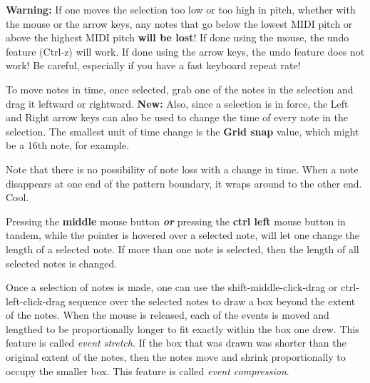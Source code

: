    \textbf{Warning:}
   If one moves the selection too low or too high in pitch, whether with the
   mouse or the arrow keys, any notes that go below the lowest MIDI pitch or
   above the highest MIDI pitch \textbf{will be lost}!
   If done using the mouse, the undo feature (Ctrl-z) will work.
   If done using the arrow keys, the undo feature does not work!
   Be careful, especially if you have a fast keyboard repeat rate!

   To move notes in time, once selected, grab one of the notes in the
   selection and drag it leftward or rightward.
   \textbf{New:}
   Also, since a selection is in force, the Left and Right arrow keys can also
   be used to change the time of every note in the selection.
   The smallest unit of time change is the \textbf{Grid snap} value,
   which might be a 16th note, for example.

   Note that there is no possibility of note loss with a change in time.  When
   a note disappears at one end of the pattern boundary, it wraps around to the
   other end.  Cool.


   Pressing the \textbf{middle} mouse button \textbf{\textsl{or}}
   pressing the \textbf{ctrl left} mouse button in tandem, while the pointer is
   hovered over a selected note, will let one
   change the length of a selected note.  If more than one note is selected,
   then the length of all selected notes is changed.

   Once a selection of notes is made, one can use the
   shift-middle-click-drag or ctrl-left-click-drag
   sequence over the selected notes to
   draw a box beyond the extent of the notes.  When the mouse is released,
   each of the events is moved and lengthed to be proportionally longer to
   fit exactly within the box one drew.
   This feature is called \textsl{event stretch}.
   If the box that was drawn was shorter than the original extent of the
   notes, then the notes move and shrink proportionally to occupy the
   smaller box.
   This feature is called \textsl{event compression}.
   
